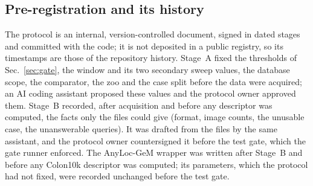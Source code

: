 \subsection{Pre-registration and its history}
\label{sec:protocol}
The protocol is an internal, version-controlled document, signed in dated
stages and committed with the code; it is not deposited in a public
registry, so its timestamps are those of the repository history. Stage~A fixed
the thresholds of Sec.~\ref{sec:gate}, the window and its two secondary sweep
values, the database scope, the comparator, the zoo and the case split before
the data were acquired; an AI coding assistant proposed these values and the
protocol owner approved them. Stage~B recorded, after acquisition and before any
descriptor was computed, the facts only the files could give (format, image
counts, the unusable case, the unanswerable queries). It was drafted from the files by the same
assistant, and the protocol owner countersigned it before the test
gate, which the gate runner enforced. The AnyLoc-GeM wrapper was written
after Stage~B and before any Colon10k descriptor was computed; its parameters,
which the protocol had not fixed, were recorded unchanged before the test
gate.

